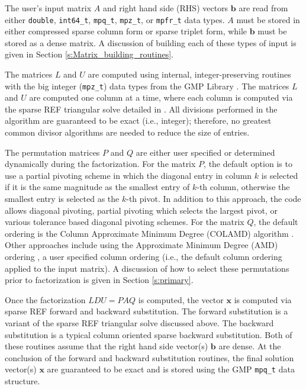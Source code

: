 \documentclass[12pt]{article}
\theoremstyle{definition}
\begin{document}
The user's input matrix $A$ and right hand side (RHS) vectors $\mathbf{b}$ are
read from either \verb|double|, \verb|int64_t|, \verb|mpq_t|, \verb|mpz_t|, or
\verb|mpfr_t| data types. $A$ must be stored in either compressed sparse column
form or sparse triplet form, while $\mathbf{b}$ must be stored as a dense
matrix. A discussion of building each of these types of input is given in
Section \ref{s:Matrix_building_routines}.

The matrices $L$ and $U$ are computed using internal, integer-preserving
routines with the big integer (\verb|mpz_t|) data types from the GMP Library
\cite{granlund2015gnu}. The matrices $L$ and $U$ are computed one column at a
time, where each column is computed via the sparse REF triangular solve
detailed in \cite{lourenco2019exact}. All divisions performed in the algorithm
are guaranteed to be exact (i.e., integer); therefore, no greatest common
divisor algorithms are needed to reduce the size of entries.

The permutation matrices $P$ and $Q$ are either user specified or determined
dynamically during the factorization. For the matrix $P$, the default option is
to use a partial pivoting scheme in which the diagonal entry in column $k$ is
selected if it is the same magnitude as the smallest entry of $k$-th column,
otherwise the smallest entry is selected as the $k$-th pivot. In addition to
this approach, the code allows diagonal pivoting, partial pivoting which
selects the largest pivot, or various tolerance based diagonal pivoting
schemes. For the matrix $Q$, the default ordering is the Column Approximate
Minimum Degree (COLAMD) algorithm
\cite{davis2004algorithmcolamd,davis2004column}. Other approaches include using
the Approximate Minimum Degree (AMD) ordering
\cite{amestoy1996approximate,amestoy2004algorithmamd}, a user specified column
ordering (i.e., the default column ordering applied to the input matrix). A
discussion of how to select these permutations prior to factorization is given
in Section \ref{s:primary}.

Once the factorization $L D U = P A Q $ is computed, the vector $\mathbf{x}$ is
computed via sparse REF forward and backward substitution. The forward
substitution is a variant of the sparse REF triangular solve discussed above.
The backward substitution is a typical column oriented sparse backward
substitution. Both of these routines assume that the right hand side vector(s)
$\mathbf{b}$ are dense. At the conclusion of the forward and backward
substitution routines, the final solution vector(s) $\mathbf{x}$ are guaranteed
to be exact and is stored using the GMP \verb|mpq_t| data structure.
\end{document}
